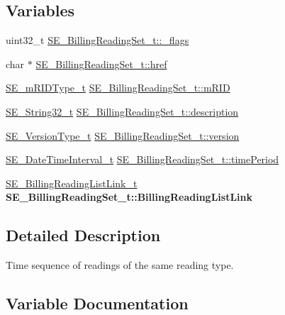 \subsection*{Variables}
\begin{DoxyCompactItemize}
\item 
uint32\+\_\+t \hyperlink{group__BillingReadingSet_gaadb95ac5d5abb72c55f707d229888950}{S\+E\+\_\+\+Billing\+Reading\+Set\+\_\+t\+::\+\_\+flags}
\item 
char $\ast$ \hyperlink{group__BillingReadingSet_ga6678b851920eb4645850476a32c6441e}{S\+E\+\_\+\+Billing\+Reading\+Set\+\_\+t\+::href}
\item 
\hyperlink{group__mRIDType_gac74622112f3a388a2851b2289963ba5e}{S\+E\+\_\+m\+R\+I\+D\+Type\+\_\+t} \hyperlink{group__BillingReadingSet_gac13de96611c3eee1e7fd3ca8c2c012b5}{S\+E\+\_\+\+Billing\+Reading\+Set\+\_\+t\+::m\+R\+ID}
\item 
\hyperlink{group__String32_gac9f59b06b168b4d2e0d45ed41699af42}{S\+E\+\_\+\+String32\+\_\+t} \hyperlink{group__BillingReadingSet_ga29d6702bd43f699cb3702eb0ca024aba}{S\+E\+\_\+\+Billing\+Reading\+Set\+\_\+t\+::description}
\item 
\hyperlink{group__VersionType_ga4b8d27838226948397ed99f67d46e2ae}{S\+E\+\_\+\+Version\+Type\+\_\+t} \hyperlink{group__BillingReadingSet_ga6cf80b1bd407c3e29e5504fd19cd6359}{S\+E\+\_\+\+Billing\+Reading\+Set\+\_\+t\+::version}
\item 
\hyperlink{structSE__DateTimeInterval__t}{S\+E\+\_\+\+Date\+Time\+Interval\+\_\+t} \hyperlink{group__BillingReadingSet_ga18291782c5aa9a4ddfc21dc65d43bae0}{S\+E\+\_\+\+Billing\+Reading\+Set\+\_\+t\+::time\+Period}
\item 
\mbox{\label{group__BillingReadingSet_ga54fb355c6aa11a71008a772d4aabf72e}} 
\hyperlink{structSE__BillingReadingListLink__t}{S\+E\+\_\+\+Billing\+Reading\+List\+Link\+\_\+t} {\bfseries S\+E\+\_\+\+Billing\+Reading\+Set\+\_\+t\+::\+Billing\+Reading\+List\+Link}
\end{DoxyCompactItemize}


\subsection{Detailed Description}
Time sequence of readings of the same reading type. 

\subsection{Variable Documentation}
\mbox{\label{group__BillingReadingSet_gaadb95ac5d5abb72c55f707d229888950}} 
